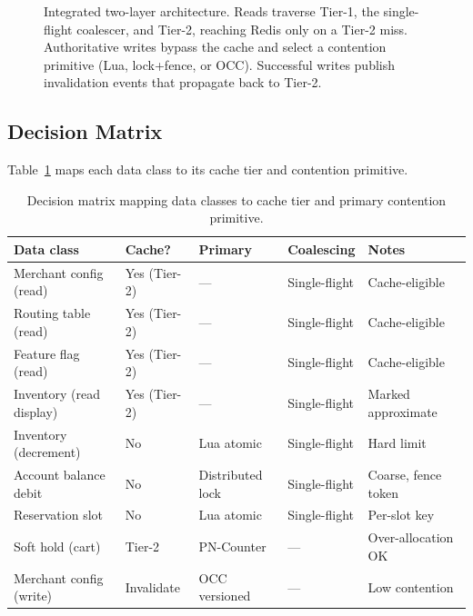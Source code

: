 \documentclass[12pt,a4paper,oneside]{report}
\begin{document}
\begin{figure}[h]
{%
}
\caption{Integrated two-layer architecture. Reads traverse Tier-1, the single-flight coalescer, and Tier-2, reaching Redis only on a Tier-2 miss. Authoritative writes bypass the cache and select a contention primitive (Lua, lock+fence, or OCC). Successful writes publish invalidation events that propagate back to Tier-2.}
\label{fig:contention}
\end{figure}

\subsection{Decision Matrix}
Table~\ref{tab:matrix} maps each data class to its cache tier and contention primitive.

\begin{table}[h]
\centering
\footnotesize
\setlength{\tabcolsep}{4pt}
\renewcommand{\arraystretch}{1.15}
\begin{tabular}{p{3.4cm}p{1.7cm}p{2.5cm}p{2.0cm}p{2.6cm}}
\toprule
\textbf{Data class} & \textbf{Cache?} & \textbf{Primary} & \textbf{Coalescing} & \textbf{Notes} \\
\midrule
Merchant config (read)   & Yes (Tier-2) & ---              & Single-flight & Cache-eligible \\
Routing table (read)     & Yes (Tier-2) & ---              & Single-flight & Cache-eligible \\
Feature flag (read)      & Yes (Tier-2) & ---              & Single-flight & Cache-eligible \\
Inventory (read display) & Yes (Tier-2) & ---              & Single-flight & Marked approximate \\
Inventory (decrement)    & No           & Lua atomic       & Single-flight & Hard limit \\
Account balance debit    & No           & Distributed lock & Single-flight & Coarse, fence token \\
Reservation slot         & No           & Lua atomic       & Single-flight & Per-slot key \\
Soft hold (cart)         & Tier-2       & PN-Counter       & ---           & Over-allocation OK \\
Merchant config (write)  & Invalidate   & OCC versioned    & ---           & Low contention \\
\bottomrule
\end{tabular}
\caption{Decision matrix mapping data classes to cache tier and primary contention primitive.}
\label{tab:matrix}
\end{table}
\end{document}
